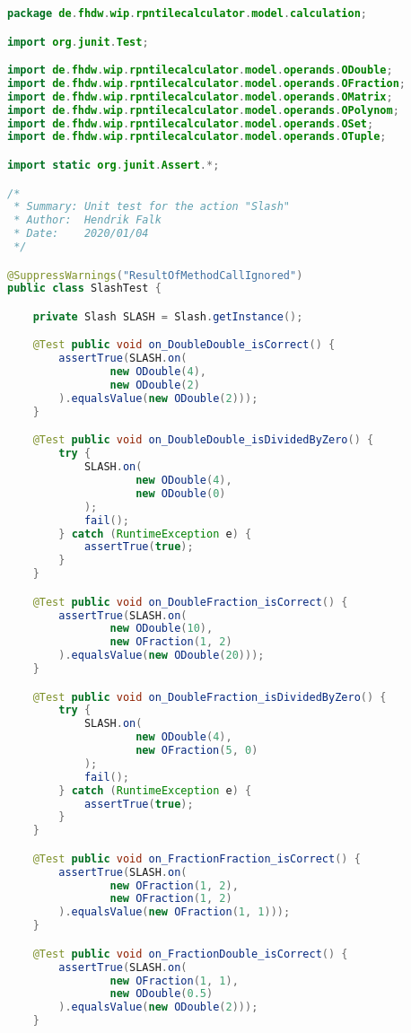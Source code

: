 \begin{lstlisting}[caption=SlashTest (Schwenke),label=list:SlashTest,language=Java]
package de.fhdw.wip.rpntilecalculator.model.calculation;

import org.junit.Test;

import de.fhdw.wip.rpntilecalculator.model.operands.ODouble;
import de.fhdw.wip.rpntilecalculator.model.operands.OFraction;
import de.fhdw.wip.rpntilecalculator.model.operands.OMatrix;
import de.fhdw.wip.rpntilecalculator.model.operands.OPolynom;
import de.fhdw.wip.rpntilecalculator.model.operands.OSet;
import de.fhdw.wip.rpntilecalculator.model.operands.OTuple;

import static org.junit.Assert.*;

/*
 * Summary: Unit test for the action "Slash"
 * Author:  Hendrik Falk
 * Date:    2020/01/04
 */

@SuppressWarnings("ResultOfMethodCallIgnored")
public class SlashTest {

    private Slash SLASH = Slash.getInstance();

    @Test public void on_DoubleDouble_isCorrect() {
        assertTrue(SLASH.on(
                new ODouble(4),
                new ODouble(2)
        ).equalsValue(new ODouble(2)));
    }

    @Test public void on_DoubleDouble_isDividedByZero() {
        try {
            SLASH.on(
                    new ODouble(4),
                    new ODouble(0)
            );
            fail();
        } catch (RuntimeException e) {
            assertTrue(true);
        }
    }

    @Test public void on_DoubleFraction_isCorrect() {
        assertTrue(SLASH.on(
                new ODouble(10),
                new OFraction(1, 2)
        ).equalsValue(new ODouble(20)));
    }

    @Test public void on_DoubleFraction_isDividedByZero() {
        try {
            SLASH.on(
                    new ODouble(4),
                    new OFraction(5, 0)
            );
            fail();
        } catch (RuntimeException e) {
            assertTrue(true);
        }
    }

    @Test public void on_FractionFraction_isCorrect() {
        assertTrue(SLASH.on(
                new OFraction(1, 2),
                new OFraction(1, 2)
        ).equalsValue(new OFraction(1, 1)));
    }

    @Test public void on_FractionDouble_isCorrect() {
        assertTrue(SLASH.on(
                new OFraction(1, 1),
                new ODouble(0.5)
        ).equalsValue(new ODouble(2)));
    }


\end{lstlisting}
